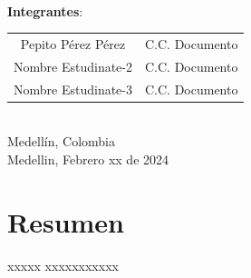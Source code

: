 \documentclass[12pt,a4paper,]{book}
\def\ifdoblecara{} %
\numberwithin{dummy}{section}
\theoremstyle{ocrenumbox}
\theoremstyle{ocrenumbox}
\theoremstyle{ocrenumbox}
\theoremstyle{ocrenumbox}
\theoremstyle{ocrenum}
\begin{document}
\begin{titlepage}
\begin{minipage}{13.5cm}
\HRule \\[1.5cm]

{\large \textbf{Integrantes}:\\[0.3cm]

\begin{tabular}{cc}
Pepito Pérez Pérez & C.C. Documento\\
Nombre Estudinate-2 & C.C. Documento\\
Nombre Estudinate-3 & C.C. Documento\\
\end{tabular}
}\\[2.5cm]

{\large
Medellín, Colombia
}\\[0.3cm]

{\large
Medellin, Febrero xx de 2024
}

\end{minipage}

\vfill %

\end{titlepage}






\setlength{\parindent}{1em}

\setlength{\headheight}{15pt}

\pagestyle{fancy}
\ifdefined\ifdoblecara
\fancyhead[LE,RO]{}
\fancyhead[LO,RE]{}
\else
\fancyhead[RO]{}
\fancyhead[LO]{}
\fi
\renewcommand{\headrulewidth}{0pt}
\renewcommand{\footrulewidth}{0pt}

\setcounter{tocdepth}{4}
\tableofcontents

\cleardoublepage

\section*{Resumen}

xxxxx xxxxxxxxxxx

\listoffigures
{}

\listoftables
{}

\cleardoublepage


\ifdefined\ifdoblecara
\fancyhead[LE,RO]{\scriptsize\rightmark}
\fancyfoot[LO,RE]{\scriptsize\slshape \leftmark}
\fancyfoot[C]{}
\fancyfoot[LE,RO]{\footnotesize\thepage}
\else
\fancyhead[RO]{\scriptsize\rightmark}
\fancyfoot[LO]{\scriptsize\slshape \leftmark}
\fancyfoot[C]{}
\fancyfoot[RO]{\footnotesize\thepage}
\fi
\end{document}
